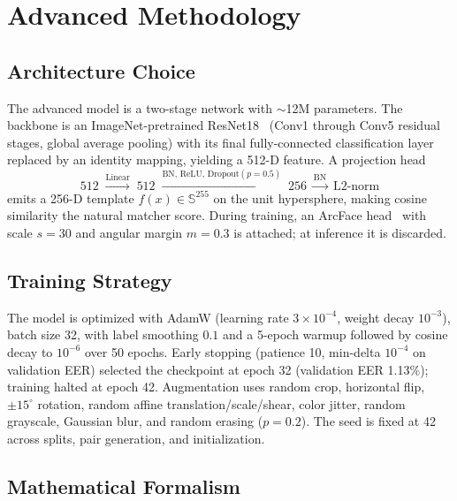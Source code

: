 \documentclass[conference]{IEEEtran}
\begin{document}
\section{Advanced Methodology}
\label{sec:method}

\subsection{Architecture Choice}
The advanced model is a two-stage network with $\sim$12M parameters. The backbone is an ImageNet-pretrained ResNet18~\cite{he2016deep} (Conv1 through Conv5 residual stages, global average pooling) with its final fully-connected classification layer replaced by an identity mapping, yielding a 512-D feature. A projection head
\[
512 \;\xrightarrow{\text{Linear}}\; 512 \;\xrightarrow{\text{BN},\,\text{ReLU},\,\text{Dropout}(p{=}0.5)}\; 256 \;\xrightarrow{\text{BN}}\; \text{L2-norm}
\]
emits a 256-D template $f(x) \in \mathbb{S}^{255}$ on the unit hypersphere, making cosine similarity the natural matcher score. During training, an ArcFace head~\cite{deng2019arcface} with scale $s\!=\!30$ and angular margin $m\!=\!0.3$ is attached; at inference it is discarded.

\subsection{Training Strategy}
The model is optimized with AdamW (learning rate $3\!\times\!10^{-4}$, weight decay $10^{-3}$), batch size 32, with label smoothing $0.1$ and a 5-epoch warmup followed by cosine decay to $10^{-6}$ over 50 epochs. Early stopping (patience 10, min-delta $10^{-4}$ on validation EER) selected the checkpoint at epoch 32 (validation EER 1.13\%); training halted at epoch 42. Augmentation uses random crop, horizontal flip, $\pm 15^\circ$ rotation, random affine translation/scale/shear, color jitter, random grayscale, Gaussian blur, and random erasing ($p{=}0.2$). The seed is fixed at 42 across splits, pair generation, and initialization.

\subsection{Mathematical Formalism}
\label{sec:math}
\end{document}
